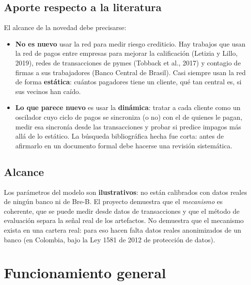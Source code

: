 \section{Aporte respecto a la literatura}
El alcance de la novedad debe precisarse:
\begin{itemize}
\item \textbf{No es nuevo} usar la red para medir riesgo crediticio. Hay trabajos que
usan la red de pagos entre empresas para mejorar la calificación (Letizia y Lillo,
2019), redes de transacciones de pymes (Tobback et al., 2017) y contagio de firmas a
sus trabajadores (Banco Central de Brasil). Casi siempre usan la red de forma
\textbf{estática}: cuántos pagadores tiene un cliente, qué tan central es, si sus
vecinos han caído.
\item \textbf{Lo que parece nuevo} es usar la \textbf{dinámica}: tratar a cada
cliente como un oscilador cuyo ciclo de pagos se sincroniza (o no) con el de quienes
le pagan, medir esa sincronía desde las transacciones y probar si predice impagos más
allá de lo estático. La búsqueda bibliográfica hecha fue corta: antes de afirmarlo en
un documento formal debe hacerse una revisión sistemática.
\end{itemize}

\section{Alcance}
\begin{limite}
Los parámetros del modelo son \textbf{ilustrativos}: no están calibrados con datos
reales de ningún banco ni de Bre-B. El proyecto demuestra que el \emph{mecanismo} es
coherente, que se puede medir desde datos de transacciones y que el método de
evaluación separa la señal real de los artefactos. No demuestra que el mecanismo
exista en una cartera real: para eso hacen falta datos reales anonimizados de un
banco (en Colombia, bajo la Ley 1581 de 2012 de protección de datos).
\end{limite}

\chapter{Funcionamiento general}

